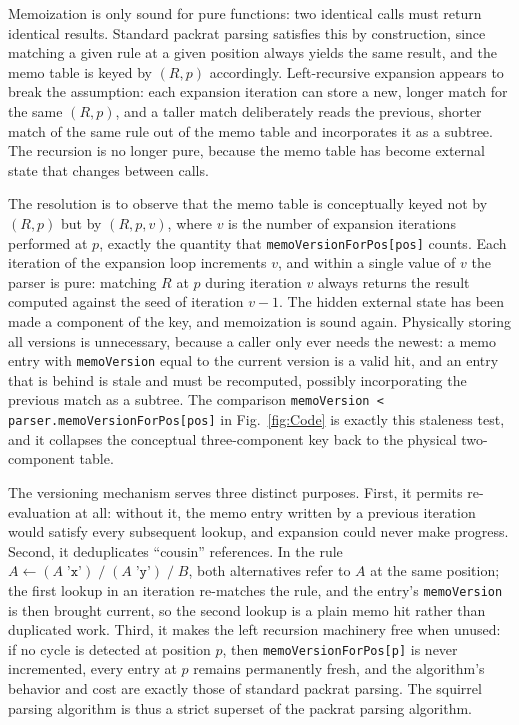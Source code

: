 \documentclass[manuscript]{acmart}
\newcommand{\cd}[1]{\texttt{#1}}
\begin{document}
Memoization is only sound for pure functions: two identical calls must return identical results. Standard packrat parsing satisfies this by construction, since matching a given rule at a given position always yields the same result, and the memo table is keyed by $(R, p)$ accordingly. Left-recursive expansion appears to break the assumption: each expansion iteration can store a new, longer match for the same $(R, p)$, and a taller match deliberately reads the previous, shorter match of the same rule out of the memo table and incorporates it as a subtree. The recursion is no longer pure, because the memo table has become external state that changes between calls.

The resolution is to observe that the memo table is conceptually keyed not by $(R, p)$ but by $(R, p, v)$, where $v$ is the number of expansion iterations performed at $p$, exactly the quantity that \cd{memoVersionForPos[pos]} counts. Each iteration of the expansion loop increments $v$, and within a single value of $v$ the parser is pure: matching $R$ at $p$ during iteration $v$ always returns the result computed against the seed of iteration $v - 1$. The hidden external state has been made a component of the key, and memoization is sound again. Physically storing all versions is unnecessary, because a caller only ever needs the newest: a memo entry with \cd{memoVersion} equal to the current version is a valid hit, and an entry that is behind is stale and must be recomputed, possibly incorporating the previous match as a subtree. The comparison \cd{memoVersion < parser.memoVersionForPos[pos]} in Fig.~\ref{fig:Code} is exactly this staleness test, and it collapses the conceptual three-component key back to the physical two-component table.

The versioning mechanism serves three distinct purposes. First, it permits re-evaluation at all: without it, the memo entry written by a previous iteration would satisfy every subsequent lookup, and expansion could never make progress. Second, it deduplicates ``cousin'' references. In the rule $A \leftarrow (A \; \texttt{'x'}) \; / \; (A \; \texttt{'y'}) \; / \; B$, both alternatives refer to $A$ at the same position; the first lookup in an iteration re-matches the rule, and the entry's \cd{memoVersion} is then brought current, so the second lookup is a plain memo hit rather than duplicated work. Third, it makes the left recursion machinery free when unused: if no cycle is detected at position $p$, then \cd{memoVersionForPos[p]} is never incremented, every entry at $p$ remains permanently fresh, and the algorithm's behavior and cost are exactly those of standard packrat parsing. The squirrel parsing algorithm is thus a strict superset of the packrat parsing algorithm.
\end{document}
